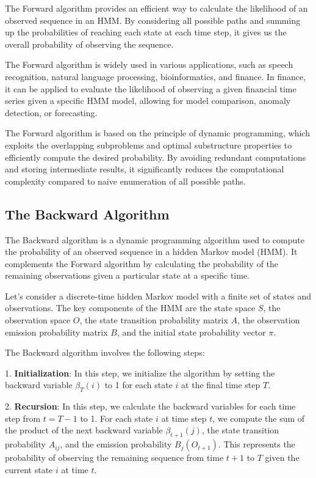 \documentclass[a4paper,11pt]{article}
\begin{document}
The Forward algorithm provides an efficient way to calculate the likelihood of an observed sequence in an HMM. By considering all possible paths and summing up the probabilities of reaching each state at each time step, it gives us the overall probability of observing the sequence.

The Forward algorithm is widely used in various applications, such as speech recognition, natural language processing, bioinformatics, and finance. In finance, it can be applied to evaluate the likelihood of observing a given financial time series given a specific HMM model, allowing for model comparison, anomaly detection, or forecasting.

The Forward algorithm is based on the principle of dynamic programming, which exploits the overlapping subproblems and optimal substructure properties to efficiently compute the desired probability. By avoiding redundant computations and storing intermediate results, it significantly reduces the computational complexity compared to naive enumeration of all possible paths.

\subsection{The Backward Algorithm}
\label{sec:backward}

The Backward algorithm is a dynamic programming algorithm used to compute the probability of an observed sequence in a hidden Markov model (HMM). It complements the Forward algorithm by calculating the probability of the remaining observations given a particular state at a specific time.

Let's consider a discrete-time hidden Markov model with a finite set of states and observations. The key components of the HMM are the state space $S$, the observation space $O$, the state transition probability matrix $A$, the observation emission probability matrix $B$, and the initial state probability vector $\pi$.

The Backward algorithm involves the following steps:

1. \textbf{Initialization}: In this step, we initialize the algorithm by setting the backward variable $\beta_T(i)$ to 1 for each state $i$ at the final time step $T$.

2. \textbf{Recursion}: In this step, we calculate the backward variables for each time step from $t = T-1$ to 1. For each state $i$ at time step $t$, we compute the sum of the product of the next backward variable $\beta_{t+1}(j)$, the state transition probability $A_{ij}$, and the emission probability $B_{j}(O_{t+1})$. This represents the probability of observing the remaining sequence from time $t+1$ to $T$ given the current state $i$ at time $t$.
\end{document}
